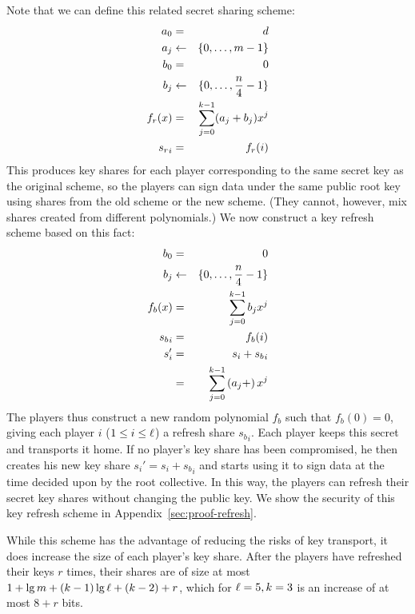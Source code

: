 {Note that we can define this related secret sharing scheme:
\begin{eqnarray*}
a_0 & = & d \\
a_j & \leftarrow & \{ 0, \dots, m-1\} \\
b_0 & = & 0 \\
b_j & \leftarrow & \{ 0, \dots, \frac{n}{4}-1\} \\
f_r(x) & = & \sum_{j=0}^{k-1} (a_j+b_j)x^j \\
{s_r}_i & = & f_r(i)
\end{eqnarray*}
This produces key shares for each player corresponding to the same
secret key as the original scheme, so the players can sign data under
the same public root key using shares from the old scheme or the new
scheme. (They cannot, however, mix shares created from different
polynomials.) We now construct a key refresh scheme based on this fact:
\begin{eqnarray*}
b_0 & = & 0 \\
b_j & \leftarrow & \{ 0, \dots, \frac{n}{4}-1\} \\
f_b(x) & = & \sum_{j=0}^{k-1} b_j x^j \\
{s_b}_i & = & f_b(i) \\
s_i' & = & s_i + {s_b}_i \\
     & = & \sum_{j=0}^{k-1} \left(a_j+\right)x^j
\end{eqnarray*}
The players thus construct a new random polynomial $f_b$ such that
$f_b(0)=0$, giving each player $i$ ($1\leq i \leq \ell$) a refresh
share ${s_b}_i$. Each player keeps this secret and transports it
home. If no player's key share has been compromised, he then creates
his new key share $s_i' = s_i + {s_b}_i$ and starts using it to sign
data at the time decided upon by the root collective. In this way, the
players can refresh their secret key shares without changing the
public key. We show the security of this key refresh scheme in
Appendix~\ref{sec:proof-refresh}.

While this scheme has the advantage of reducing the risks of key
transport, it does increase the size of each player's key share. After
the players have refreshed their keys $r$ times, their shares are of
size at most $1 + \lg m + (k -1)\lg \ell + (k-2) + r$, which
for $\ell=5, k=3$ is an increase of at most $8+r$ bits.
}


